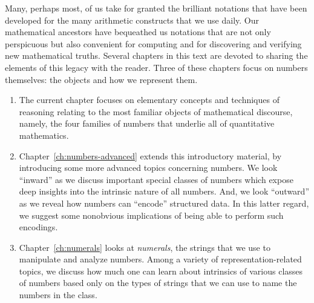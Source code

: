 Many, perhaps most, of us take for granted the brilliant notations that have been developed for the many arithmetic constructs that we use daily.  Our mathematical ancestors have bequeathed us notations that are not only perspicuous but also convenient for computing and for discovering and verifying new mathematical truths.  Several chapters in this text are devoted to sharing the elements of this legacy with the reader.  Three of these chapters focus on numbers themselves: the objects and how we represent them.
\begin{enumerate}
\item
The current chapter focuses on elementary concepts and techniques of reasoning relating to the most familiar objects of mathematical discourse, namely, the four families of numbers that underlie all of quantitative mathematics.
\medskip\item
Chapter~\ref{ch:numbers-advanced} extends this introductory material, by introducing some more advanced topics concerning numbers.  We look ``inward'' as we discuss important special classes of numbers which expose deep insights into the intrinsic nature of all numbers.  And, we
look ``outward'' as we reveal how numbers can ``encode'' structured data.  In this latter regard, we suggest some nonobvious implications of being able to perform such encodings.
\medskip\item
Chapter~\ref{ch:numerals} looks at {\it numerals}, the strings that we use to manipulate and analyze numbers.  Among a variety of representation-related topics, we discuss how much one can learn about intrinsics of various classes of numbers based only on the types of strings that we can use to name the numbers in the class.
\end{enumerate}
  

\noindent {}


